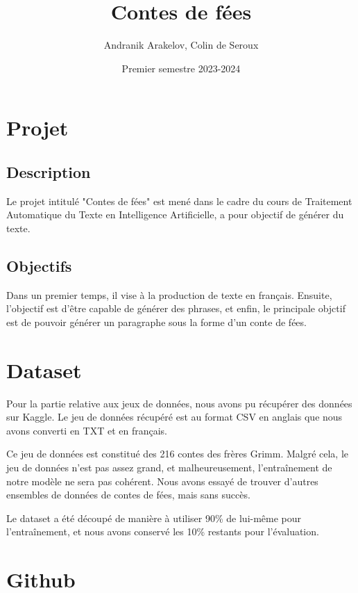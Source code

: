 \documentclass{rapport}
\title{Contes de fées}
\author{Andranik Arakelov, Colin de Seroux}
\date{Premier semestre 2023-2024}
\begin{document}
    \maketitle
  
    \tableofcontents
    
    \clearpage

    \section{Projet}

        \subsection{Description}
        
            Le projet intitulé "Contes de fées" est mené dans le cadre du cours de Traitement Automatique du Texte en Intelligence Artificielle, a pour objectif de générer du texte. 

        \subsection{Objectifs}

            Dans un premier temps, il vise à la production de texte en français. Ensuite, l'objectif est d'être capable de générer des phrases, et enfin, le principale objctif est de pouvoir générer un paragraphe sous la forme d'un conte de fées.

    \section{Dataset}
    
        Pour la partie relative aux jeux de données, nous avons pu récupérer des données sur Kaggle. Le jeu de données récupéré est au format CSV en anglais que nous avons converti en TXT et en français.

        Ce jeu de données est constitué des 216 contes des frères Grimm. Malgré cela, le jeu de données n'est pas assez grand, et malheureusement, l'entraînement de notre modèle ne sera pas cohérent. Nous avons essayé de trouver d'autres ensembles de données de contes de fées, mais sans succès.

        Le dataset a été découpé de manière à utiliser 90\% de lui-même pour l'entraînement, et nous avons conservé les 10\% restants pour l'évaluation.

    \section{Github}
\end{document}
